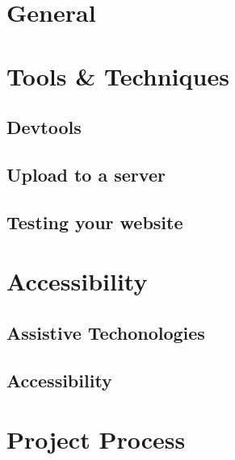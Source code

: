 \documentclass[b5paper,openany]{book}
\begin{document}
\tp


\tableofcontents




\chapter{General}



\chapter{Tools \& Techniques}

\section{Devtools}


\section{Upload to a server}
% 

\section{Testing your website}
% 


\chapter{Accessibility}

\section{Assistive Techonologies}
% 

\section{Accessibility}
% 


\chapter{Project Process}
\end{document}
